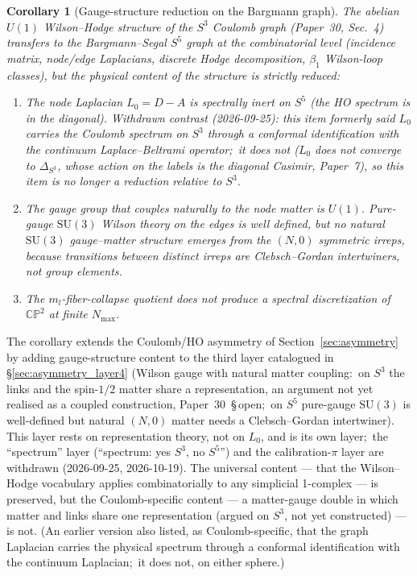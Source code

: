 \documentclass[twocolumn,pra,amsmath,amssymb,superscriptaddress]{revtex4-2}
\newtheorem{corollary}{Corollary}
\begin{document}
\begin{corollary}[Gauge-structure reduction on the Bargmann graph]
\label{cor:gauge-structure-reduction}
The abelian $U(1)$ Wilson--Hodge structure of the $S^3$ Coulomb
graph (Paper~30, Sec.~4) transfers to the Bargmann--Segal $S^5$ graph at
the combinatorial level (incidence matrix, node/edge Laplacians,
discrete Hodge decomposition, $\beta_1$ Wilson-loop classes), but
the physical content of the structure is strictly reduced:
\begin{enumerate}
\item The node Laplacian $L_0 = D - A$ is spectrally inert on $S^5$ (the
  HO spectrum is in the diagonal).  \emph{Withdrawn contrast
  (2026-09-25):} this item formerly said $L_0$ carries the Coulomb
  spectrum on $S^3$ through a conformal identification with the
  continuum Laplace--Beltrami operator;\ it does not ($L_0$ does not
  converge to $\Delta_{S^3}$, whose action on the labels is the diagonal
  Casimir, Paper~7), so this item is no longer a reduction relative to
  $S^3$.
\item The gauge group that couples naturally to the node matter is
  $U(1)$.  Pure-gauge $\mathrm{SU}(3)$ Wilson theory on the edges is
  well defined, but no natural $\mathrm{SU}(3)$ gauge--matter
  structure emerges from the $(N, 0)$ symmetric irreps, because
  transitions between distinct irreps are Clebsch--Gordan
  intertwiners, not group elements.
\item The $m_l$-fiber-collapse quotient does not produce a
  spectral discretization of $\mathbb{CP}^2$ at finite $N_{\max}$.
\end{enumerate}
\end{corollary}

The corollary extends the Coulomb/HO asymmetry of
Section~\ref{sec:asymmetry} by adding gauge-structure content to the
third layer catalogued in \S\ref{sec:asymmetry_layer4} (Wilson gauge
with natural matter coupling:\ on $S^3$ the links and the spin-$1/2$
matter share a representation, an argument not yet realised as a
coupled construction, Paper~30~\S\,open;\ on $S^5$ pure-gauge
$\mathrm{SU}(3)$ is well-defined but natural $(N,0)$ matter needs a
Clebsch--Gordan intertwiner).  This layer rests on representation
theory, not on $L_0$, and is its own layer;\ the ``spectrum'' layer (``spectrum: yes
$S^3$, no $S^5$'') and the calibration-$\pi$ layer are withdrawn
(2026-09-25, 2026-10-19).
The universal content --- that the Wilson--Hodge vocabulary applies
combinatorially to any simplicial 1-complex --- is preserved, but
the Coulomb-specific content --- a matter-gauge double in which matter
and links share one representation (argued on $S^3$, not yet
constructed) --- is not.  (An earlier version also listed, as Coulomb-specific, that the
graph Laplacian carries the physical spectrum through a conformal
identification with the continuum Laplacian;\ it does not, on either
sphere.)
\end{document}
